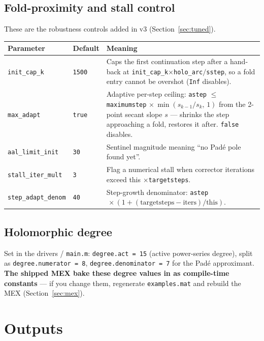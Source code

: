 \documentclass[11pt,a4paper]{article}
\newcommand{\code}[1]{\texttt{#1}}
\begin{document}
\subsection{Fold-proximity and stall control}
These are the robustness controls added in v3 (Section~\ref{sec:tuned}).
\begin{center}\small
\begin{longtable}{@{}p{}p{}p{}@{}}
\toprule
\textbf{Parameter} & \textbf{Default} & \textbf{Meaning}\\
\midrule\endhead
\code{init_cap_k}    & \code{1500} & Caps the first continuation step after a hand-back at \code{init_cap_k}$\times$\code{holo_arc}$/$\code{sstep}, so a fold entry cannot be overshot (\code{Inf} disables).\\
\code{max_adapt}     & \code{true} & Adaptive per-step ceiling: \code{astep} $\le$ \code{maximumstep}$\,\times\min(s_{k-1}/s_k,\,1)$ from the 2-point secant slope $s$ --- shrinks the step approaching a fold, restores it after. \code{false} disables.\\
\code{aal_limit_init}& \code{30}   & Sentinel magnitude meaning ``no Pad\'e pole found yet''.\\
\code{stall_iter_mult}& \code{3}   & Flag a numerical stall when corrector iterations exceed this $\times$\code{targetsteps}.\\
\code{step_adapt_denom}& \code{40} & Step-growth denominator: \code{astep}$\,\times(1+(\text{targetsteps}-\text{iters})/\text{this})$.\\
\bottomrule
\end{longtable}
\end{center}

\subsection{Holomorphic degree}
Set in the drivers / \code{main.m}: \code{degree.act = 15} (active power-series degree),
split as \code{degree.numerator = 8}, \code{degree.denominator = 7} for the Pad\'e
approximant. \textbf{The shipped MEX bake these degree values in as compile-time
constants} --- if you change them, regenerate \code{examples.mat} and rebuild the MEX
(Section~\ref{sec:mex}).

\section{Outputs}
\end{document}
